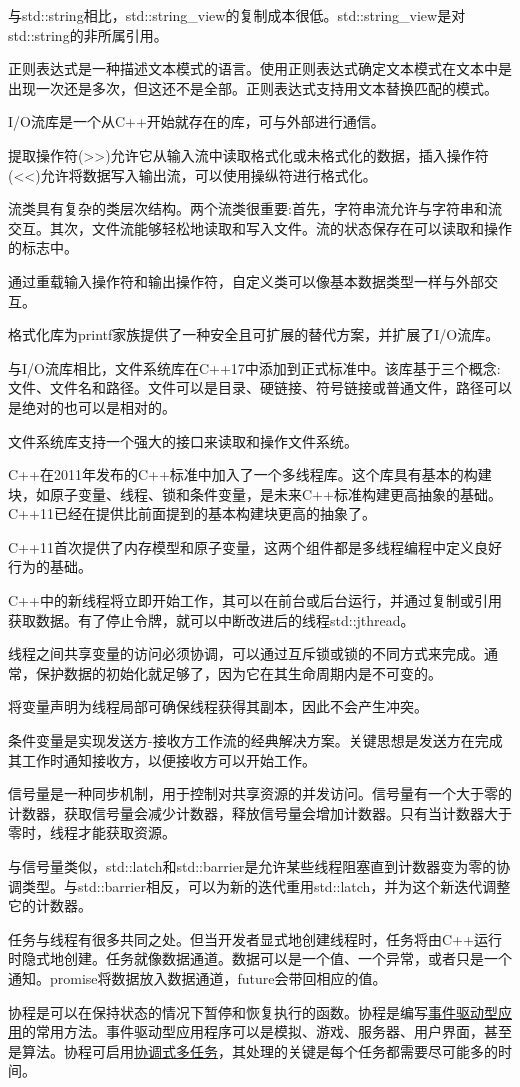 与std::string相比，std::string\_view的复制成本很低。std::string\_view是对std::string的非所属引用。

正则表达式是一种描述文本模式的语言。使用正则表达式确定文本模式在文本中是出现一次还是多次，但这还不是全部。正则表达式支持用文本替换匹配的模式。


I/O流库是一个从C++开始就存在的库，可与外部进行通信。

提取操作符(>{}>)允许它从输入流中读取格式化或未格式化的数据，插入操作符(<{}<)允许将数据写入输出流，可以使用操纵符进行格式化。

流类具有复杂的类层次结构。两个流类很重要:首先，字符串流允许与字符串和流交互。其次，文件流能够轻松地读取和写入文件。流的状态保存在可以读取和操作的标志中。

通过重载输入操作符和输出操作符，自定义类可以像基本数据类型一样与外部交互。

格式化库为printf家族提供了一种安全且可扩展的替代方案，并扩展了I/O流库。

与I/O流库相比，文件系统库在C++17中添加到正式标准中。该库基于三个概念:文件、文件名和路径。文件可以是目录、硬链接、符号链接或普通文件，路径可以是绝对的也可以是相对的。

文件系统库支持一个强大的接口来读取和操作文件系统。


C++在2011年发布的C++标准中加入了一个多线程库。这个库具有基本的构建块，如原子变量、线程、锁和条件变量，是未来C++标准构建更高抽象的基础。C++11已经在提供比前面提到的基本构建块更高的抽象了。

C++11首次提供了内存模型和原子变量，这两个组件都是多线程编程中定义良好行为的基础。

C++中的新线程将立即开始工作，其可以在前台或后台运行，并通过复制或引用获取数据。有了停止令牌，就可以中断改进后的线程std::jthread。

线程之间共享变量的访问必须协调，可以通过互斥锁或锁的不同方式来完成。通常，保护数据的初始化就足够了，因为它在其生命周期内是不可变的。

将变量声明为线程局部可确保线程获得其副本，因此不会产生冲突。

条件变量是实现发送方-接收方工作流的经典解决方案。关键思想是发送方在完成其工作时通知接收方，以便接收方可以开始工作。

信号量是一种同步机制，用于控制对共享资源的并发访问。信号量有一个大于零的计数器，获取信号量会减少计数器，释放信号量会增加计数器。只有当计数器大于零时，线程才能获取资源。

与信号量类似，std::latch和std::barrier是允许某些线程阻塞直到计数器变为零的协调类型。与std::barrier相反，可以为新的迭代重用std::latch，并为这个新迭代调整它的计数器。

任务与线程有很多共同之处。但当开发者显式地创建线程时，任务将由C++运行时隐式地创建。任务就像数据通道。数据可以是一个值、一个异常，或者只是一个通知。promise将数据放入数据通道，future会带回相应的值。

协程是可以在保持状态的情况下暂停和恢复执行的函数。协程是编写\href{https://en.wikipedia.org/wiki/Event-driven_programming}{事件驱动型应用}的常用方法。事件驱动型应用程序可以是模拟、游戏、服务器、用户界面，甚至是算法。协程可启用\href{https://de.wikipedia.org/wiki/Multitasking}{协调式多任务}，其处理的关键是每个任务都需要尽可能多的时间。